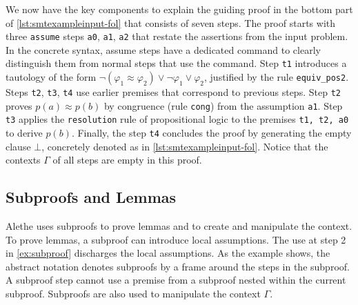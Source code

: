 We now have the key components to explain the guiding proof in the bottom part of \cref{lst:smtexampleinput-fol} that consists of seven steps. The proof starts with three \texttt{assume} steps \texttt{a0}, \texttt{a1}, \texttt{a2} that restate the assertions from the input problem.
In the concrete syntax, assume steps have a dedicated command  to clearly distinguish them from normal steps that use the  command.
Step \texttt{t1} introduces a tautology of the form $\neg (\varphi_1 \approx \varphi_2) \lor \neg \varphi_1 \lor \varphi_2$, justified by the rule \colorbox{purple!30}{\texttt{equiv\_pos2}}. Steps \texttt{t2}, \texttt{t3}, \texttt{t4} use earlier premises that correspond to previous steps.
Step \texttt{t2} proves $p(a) \approx p(b)$ by congruence (rule \colorbox{purple!30}{\texttt{cong}}) from the assumption \texttt{a1}.
Step \texttt{t3} applies the \colorbox{purple!30}{\texttt{resolution}} rule of propositional logic to the premises \texttt{t1, t2, a0} to derive $p(b)$. Finally, the step \texttt{t4} concludes the proof by generating the empty clause $\bot$, concretely denoted as  in \cref{lst:smtexampleinput-fol}. %
Notice that the contexts \colorbox{blue!30}{$\Gamma$} of all steps are empty in this proof.

\subsection{Subproofs and Lemmas}
\label{ssec:subproof-desc}

Alethe uses subproofs to prove lemmas and to create and manipulate the context. To prove lemmas, a subproof can introduce
local assumptions. The  use at step 2 in \cref{ex:subproof} discharges the local assumptions.
As the example shows, the abstract notation denotes subproofs by a frame around the steps in the subproof.
A subproof step cannot use a premise from a subproof nested within the current subproof.
Subproofs are also used to manipulate the context \colorbox{blue!30}{$\Gamma$}.

